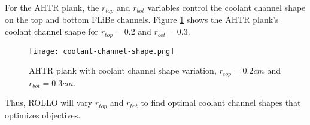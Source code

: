 For the \gls{AHTR} plank, the $r_{top}$ and $r_{bot}$ variables control the coolant channel 
shape on the top and bottom \gls{FLiBe} channels. 
Figure \ref{fig:coolant-channel-shape} shows the \gls{AHTR} plank's coolant channel 
shape for $r_{top} = 0.2$ and $r_{bot} = 0.3$.
\begin{figure}[htbp]
    \centering
        \texttt{[image: coolant-channel-shape.png]}
    \raggedright
    \caption{\acrfull{AHTR} plank with coolant channel shape variation, $r_{top} 
    = 0.2cm$ and $r_{bot} = 0.3cm$.}  
    \label{fig:coolant-channel-shape}
\end{figure}
Thus, \gls{ROLLO} will vary $r_{top}$ and $r_{bot}$ to find optimal coolant 
channel shapes that optimizes objectives.

